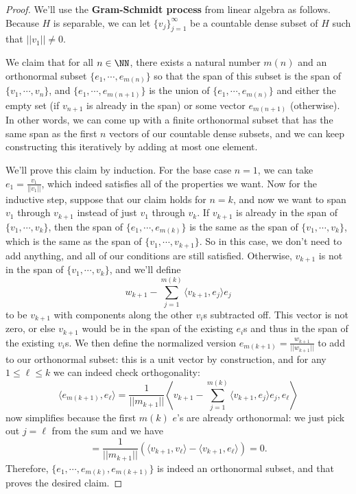 \begin{proof}
We'll use the \textbf{Gram-Schmidt process} from linear algebra as follows. Because $H$ is separable, we can let $\{v_j\}_{j=1}^{\infty}$ be a countable dense subset of $H$ such that $||v_1|| \ne 0$. 

We claim that for all $n \in \NN$, there exists a natural number $m(n)$ and an orthonormal subset $\{e_1, \cdots, e_{m(n)}\}$ so that the span of this subset is the span of $\{v_1, \cdots, v_n\}$, and $\{e_1, \cdots, e_{m(n+1)}\}$ is the union of $\{e_1, \cdots, e_{m(n)}\}$ and either the empty set (if $v_{n+1}$ is already in the span) or some vector $e_{m(n+1)}$ (otherwise). In other words, we can come up with a finite orthonormal subset that has the same span as the first $n$ vectors of our countable dense subsets, and we can keep constructing this iteratively by adding at most one element. 

We'll prove this claim by induction. For the base case $n = 1$, we can take $e_1 = \frac{v_1}{||v_1||}$, which indeed satisfies all of the properties we want. Now for the inductive step, suppose that our claim holds for $n = k$, and now we want to span $v_1$ through $v_{k+1}$ instead of just $v_1$ through $v_k$. If $v_{k+1}$ is already in the span of $\{v_1, \cdots, v_k\}$, then the span of $\{e_1, \cdots, e_{m(k)}\}$ is the same as the span of $\{v_1, \cdots, v_k\}$, which is the same as the span of $\{v_1, \cdots, v_{k+1}\}$. So in this case, we don't need to add anything, and all of our conditions are still satisfied. Otherwise, $v_{k+1}$ is not in the span of $\{v_1, \cdots, v_k\}$, and we'll define
\[
    w_{k+1} - \sum_{j=1}^{m(k)} \langle v_{k+1}, e_j \rangle e_j
\]
to be $v_{k+1}$ with components along the other $v_i$s subtracted off. This vector is not zero, or else $v_{k+1}$ would be in the span of the existing $e_i$s and thus in the span of the existing $v_i$s. We then define the normalized version $e_{m(k+1)} = \frac{w_{k+1}}{||w_{k+1}||}$ to add to our orthonormal subset: this is a unit vector by construction, and for any $1 \le \ell \le k$ we can indeed check orthogonality:
\[
    \langle e_{m(k+1)}, e_\ell \rangle = \frac{1}{||m_{k+1}||} \left\langle v_{k+1} - \sum_{j=1}^{m(k)} \langle v_{k+1}, e_j \rangle e_j, e_\ell \right\rangle
\]
now simplifies because the first $m(k)$ $e$'s are already orthonormal: we just pick out $j = \ell$ from the sum and we have
\[
    = \frac{1}{||m_{k+1}||} \left(\langle v_{k+1}, v_\ell \rangle - \langle v_{k+1}, e_\ell \rangle \right) = 0.
\]  
Therefore, $\{e_1, \cdots, e_{m(k)}, e_{m(k+1)}\}$ is indeed an orthonormal subset, and that proves the desired claim.


\end{proof}
